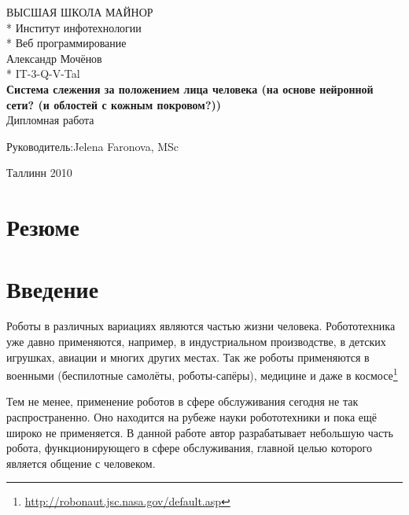 \documentclass[12pt]{report}
\begin{document}

\begin{titlepage}
  \begin{center}
	\uppercase{Высшая школа майнор}\\*
	Институт инфотехнологии\\*
	Веб программирование\\[8cm]
	Александр Мочёнов\\*
	IT-3-Q-V-Tal\\[0.5cm]
	\large
	\textbf{Система слежения за положением лица человека (на основе нейронной сети? (и облостей с кожным покровом?))}\\[1cm]
	\normalsize
	Дипломная работа\\[2cm]
	\begin{flushright}
		Руководитель:Jelena Faronova, MSc\\[7cm]
	\end{flushright}
	Таллинн 2010
  \end{center}
\end{titlepage}

\tableofcontents{\thispagestyle{fancyplain}}

\chapter*{Резюме}
\thispagestyle{fancy}



\chapter*{Введение}
\thispagestyle{fancy}

Роботы в различных вариациях являются частью жизни человека. Робототехника уже
давно применяются, например, в индустриальном производстве, в детских игрушках,
авиации и многих других местах. Так же роботы применяются в военными (беспилотные
самолёты, роботы-сапёры), медицине и даже в космосе\footnote{\url{http://robonaut.jsc.nasa.gov/default.asp}}

Тем не менее, применение роботов в сфере обслуживания сегодня не так распространенно. Оно находится на рубеже науки робототехники и пока ещё широко не применяется. В данной работе автор разрабатывает небольшую
часть робота, функционирующего в сфере обслуживания, главной целью которого
является общение с человеком. 
\end{document}
